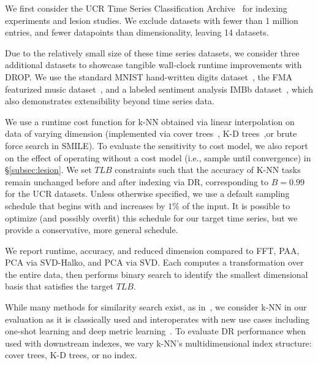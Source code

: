 We first consider the UCR Time Series Classification Archive~\cite{ucr} for indexing experiments and lesion studies. 
We exclude datasets with fewer than 1 million entries, and fewer datapoints than dimensionality, leaving 14 datasets. 

Due to the relatively small size of these time series datasets, we consider three additional datasets to showcase tangible wall-clock runtime improvements with DROP.
We use the standard MNIST hand-written digits dataset~\cite{mnist}, the FMA featurized music dataset~\cite{fma}, and a labeled sentiment analysis IMBb dataset~\cite{imdb}, which also demonstrates extensibility beyond time series data. 

 We use a runtime cost function for k-NN obtained via linear interpolation on data of varying dimension (implemented via cover trees~\cite{ctree}, K-D trees~\cite{kdtree},or brute force search in SMILE).
To evaluate the sensitivity to cost model, we also report on the effect of operating without a cost model (i.e., sample until convergence) in \S\ref{subsec:lesion}.
We set $TLB$ constraints such that the accuracy of K-NN tasks remain unchanged before and after indexing via DR, corresponding to $B = 0.99$  for the UCR datasets.
Unless otherwise specified, we use a default sampling schedule that begins with and increases by $1\%$ of the input.
It is possible to optimize (and possibly overfit) this schedule for our target time series, but we provide a conservative, more general schedule.

 We report runtime, accuracy, and reduced dimension compared to FFT, PAA, PCA via SVD-Halko, and PCA via SVD. 
Each computes a transformation over the entire data, then performs binary search to identify the smallest dimensional basis that satisfies the target $TLB$. 

While many methods for similarity search exist, as in~\cite{keogh-study}, we consider k-NN in our evaluation as it is classically used and  interoperates with new use cases including one-shot learning and deep metric learning~\cite{knn1, knn2, knn3}.
To evaluate DR performance when used with downstream indexes, we vary k-NN's multidimensional index structure: cover trees, K-D trees, or no index. 

